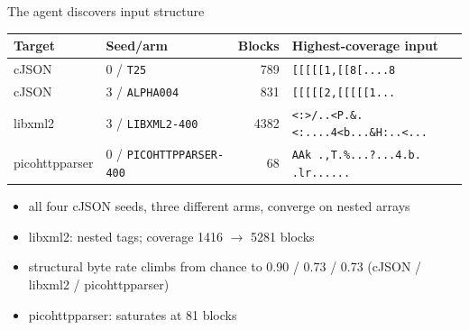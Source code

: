 \documentclass[aspectratio=169,10pt]{beamer}
\newcommand{\code}[1]{\texttt{#1}}
\newcommand{\arm}[1]{\texttt{#1}}
\begin{document}
\begin{frame}{The agent discovers input structure}
  \centering
  \footnotesize
  \begin{tabular}{@{}llrl@{}}
    \toprule
    Target & Seed/arm & Blocks & Highest-coverage input \\
    \midrule
    cJSON & 0 / \arm{T25} & 789 & \code{[[[[[1,[[8[....8} \\
    cJSON & 3 / \arm{ALPHA004} & 831 & \code{[[[[[2,[[[[[1...} \\
    libxml2 & 3 / \arm{LIBXML2-400} & 4382 & \code{<:>/..<P.\&.<:....4<b...\&H:..<...} \\
    picohttpparser & 0 / \arm{PICOHTTPPARSER-400} & 68 & \code{AAk  .,T.\%...?...4.b.  .lr......} \\
    \bottomrule
  \end{tabular}
  \begin{itemize}
    \item all four cJSON seeds, three different arms, converge on nested arrays
    \item libxml2: nested tags; coverage \num{1416} $\to$ \num{5281} blocks
    \item structural byte rate climbs from chance to \num{0.90} /
      \num{0.73} / \num{0.73} (cJSON / libxml2 / picohttpparser)
    \item picohttpparser: saturates at \num{81} blocks
  \end{itemize}
\end{frame}
\end{document}
